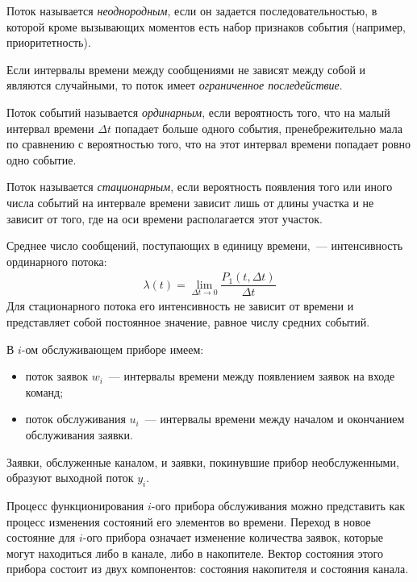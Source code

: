 \begin{dd}
    Поток называется \textit{неоднородным}, если он задается последовательностью, в которой кроме вызывающих моментов есть набор признаков события (например, приоритетность).
\end{dd}

\begin{dd}
    Если интервалы времени между сообщениями не зависят между собой и являются случайными, то поток имеет \textit{ограниченное последействие}.
\end{dd}

\begin{dd}
    Поток событий называется \textit{ординарным}, если вероятность того, что на малый интервал времени $\Delta t$ попадает больше одного события, пренебрежительно мала по сравнению с вероятностью того, что на этот интервал времени попадает ровно одно событие.
\end{dd}

\begin{dd}
    Поток называется \textit{стационарным}, если вероятность появления того или иного числа событий на интервале времени зависит лишь от длины участка и не зависит от того, где на оси времени располагается этот участок.
\end{dd}

Среднее число сообщений, поступающих в единицу времени,~--- интенсивность ординарного потока:
%
\begin{gather*}
    \lambda(t) = \lim\limits_{\Delta t\rightarrow 0}\dfrac{P_1(t, \Delta t)}{\Delta t}
\end{gather*}
%
Для стационарного потока его интенсивность не зависит от времени и представляет собой постоянное значение, равное числу средних событий.

В $i$-ом обслуживающем приборе имеем:

\begin{itemize}
    \item поток заявок $w_i$~--- интервалы времени между появлением заявок на входе команд;
    \item поток обслуживания $u_i$~--- интервалы времени между началом и окончанием обслуживания заявки.
\end{itemize}

Заявки, обслуженные каналом, и заявки, покинувшие прибор необслуженными, образуют выходной поток $y_i$.

Процесс функционирования $i$-ого прибора обслуживания можно представить как процесс изменения состояний его элементов во времени. Переход в новое состояние для $i$-ого прибора означает изменение количества заявок, которые могут находиться либо в канале, либо в накопителе. Вектор состояния этого прибора состоит из двух компонентов: состояния накопителя и состояния канала.

